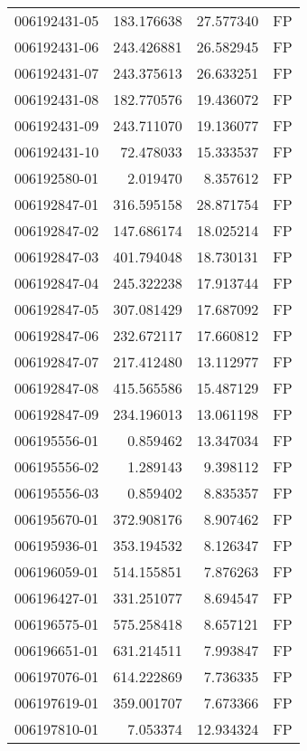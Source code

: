 \begin{tabular}{lrrl}
006192431-05 &  183.176638 &      27.577340 &   FP \\
006192431-06 &  243.426881 &      26.582945 &   FP \\
006192431-07 &  243.375613 &      26.633251 &   FP \\
006192431-08 &  182.770576 &      19.436072 &   FP \\
006192431-09 &  243.711070 &      19.136077 &   FP \\
006192431-10 &   72.478033 &      15.333537 &   FP \\
006192580-01 &    2.019470 &       8.357612 &   FP \\
006192847-01 &  316.595158 &      28.871754 &   FP \\
006192847-02 &  147.686174 &      18.025214 &   FP \\
006192847-03 &  401.794048 &      18.730131 &   FP \\
006192847-04 &  245.322238 &      17.913744 &   FP \\
006192847-05 &  307.081429 &      17.687092 &   FP \\
006192847-06 &  232.672117 &      17.660812 &   FP \\
006192847-07 &  217.412480 &      13.112977 &   FP \\
006192847-08 &  415.565586 &      15.487129 &   FP \\
006192847-09 &  234.196013 &      13.061198 &   FP \\
006195556-01 &    0.859462 &      13.347034 &   FP \\
006195556-02 &    1.289143 &       9.398112 &   FP \\
006195556-03 &    0.859402 &       8.835357 &   FP \\
006195670-01 &  372.908176 &       8.907462 &   FP \\
006195936-01 &  353.194532 &       8.126347 &   FP \\
006196059-01 &  514.155851 &       7.876263 &   FP \\
006196427-01 &  331.251077 &       8.694547 &   FP \\
006196575-01 &  575.258418 &       8.657121 &   FP \\
006196651-01 &  631.214511 &       7.993847 &   FP \\
006197076-01 &  614.222869 &       7.736335 &   FP \\
006197619-01 &  359.001707 &       7.673366 &   FP \\
006197810-01 &    7.053374 &      12.934324 &   FP \\

\end{tabular}
